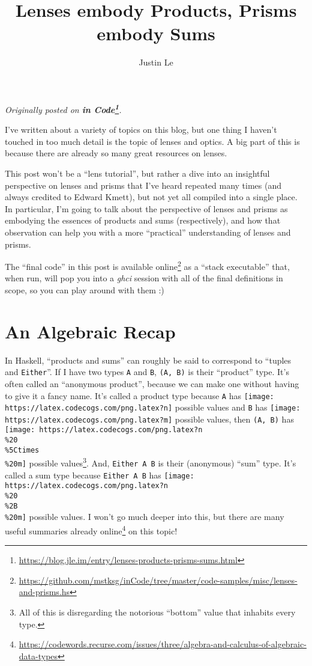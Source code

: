 \documentclass[]{article}
\title{Lenses embody Products, Prisms embody Sums}
\author{Justin Le}
\renewcommand{\href}[2]{#2\footnote{\url{#1}}}
\begin{document}
\maketitle

\emph{Originally posted on
\textbf{\href{https://blog.jle.im/entry/lenses-products-prisms-sums.html}{in
Code}}.}

I've written about a variety of topics on this blog, but one thing I haven't
touched in too much detail is the topic of lenses and optics. A big part of this
is because there are already so many great resources on lenses.

This post won't be a ``lens tutorial'', but rather a dive into an insightful
perspective on lenses and prisms that I've heard repeated many times (and always
credited to Edward Kmett), but not yet all compiled into a single place. In
particular, I'm going to talk about the perspective of lenses and prisms as
embodying the essences of products and sums (respectively), and how that
observation can help you with a more ``practical'' understanding of lenses and
prisms.

The ``final code'' in this post is
\href{https://github.com/mstksg/inCode/tree/master/code-samples/misc/lenses-and-prisms.hs}{available
online} as a ``stack executable'' that, when run, will pop you into a
\emph{ghci} session with all of the final definitions in scope, so you can play
around with them :)

\hypertarget{an-algebraic-recap}{%
\section{An Algebraic Recap}\label{an-algebraic-recap}}

In Haskell, ``products and sums'' can roughly be said to correspond to ``tuples
and \texttt{Either}''. If I have two types \texttt{A} and \texttt{B},
\texttt{(A,\ B)} is their ``product'' type. It's often called an ``anonymous
product'', because we can make one without having to give it a fancy name. It's
called a product type because \texttt{A} has
\texttt{[image: https://latex.codecogs.com/png.latex?n]} possible values and
\texttt{B} has \texttt{[image: https://latex.codecogs.com/png.latex?m]} possible
values, then \texttt{(A,\ B)} has
\texttt{[image: https://latex.codecogs.com/png.latex?n\\\%20\\\%5Ctimes\\\%20m]}
possible values\footnote{All of this is disregarding the notorious ``bottom''
  value that inhabits every type.}. And, \texttt{Either\ A\ B} is their
(anonymous) ``sum'' type. It's called a sum type because \texttt{Either\ A\ B}
has \texttt{[image: https://latex.codecogs.com/png.latex?n\\\%20\\\%2B\\\%20m]}
possible values. I won't go much deeper into this, but there are
\href{https://codewords.recurse.com/issues/three/algebra-and-calculus-of-algebraic-data-types}{many
useful summaries already online} on this topic!
\end{document}
